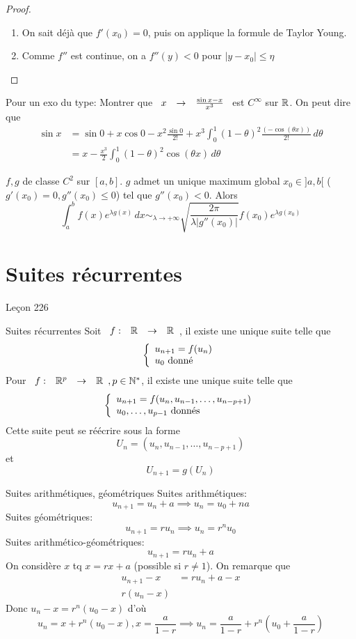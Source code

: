 \documentclass[]{report}
\begin{document}
\begin{proof}
    \begin{enumerate}
        \item On sait déjà que $f'(x_0)=0$, puis on applique la formule de Taylor Young.
        \item Comme $f''$ est continue, on a $f''(y)<0$ pour $|y-x_0|\le \eta$
    \end{enumerate}
\end{proof}

\begin{re}{}{}
    Pour un exo du type: Montrer que $\begin{array}{ccccc} x & \to & \frac{\sin x-x}{ x^3} \end{array}$ est $C^\infty$ sur $\mathbb{R}$. On peut dire que
    \begin{align*}
        \sin x & = \sin 0 +x\cos 0 - x^2\frac{\sin 0}{2!}+x^3 \int_0^1 (1-\theta)^2 \frac{\left(-\cos (\theta x)\right)}{2!}\, d\theta \\
               & = x-\frac{x^3}{2}\int_{0}^{1}(1-\theta)^2 \cos (\theta x)\, d\theta
    \end{align*}
\end{re}

\begin{prop}{}{}
    $f,g$ de classe $C^2$ sur $[a,b]$. $g$ admet un unique maximum global $x_0\in ]a,b[$ ($g'(x_0)=0,g''(x_0)\le 0$) tel que $g''(x_0)<0$. Alors \\
    \[\int_{a}^{b} f(x) e^{\lambda g(x)}\, dx  \sim_{\lambda \to +\infty} \sqrt{\frac{2\pi}{\lambda \left|g''(x_0)\right|}} f(x_0) e^{\lambda g(x_0)}\]
\end{prop}

\chapter{Suites récurrentes}

Leçon 226

\begin{df}{Suites récurrentes}{}
    Soit $\begin{array}{ccccc} f : & \mathbb{R} & \to & \mathbb{R} \end{array}$, il existe une unique suite telle que
    \[\left\{\begin{array}{ll} u_{n+1}=f(u_n)\\ u_0 \text{ donné} \end{array} \right.\]
    Pour $\begin{array}{ccccc} f : & \mathbb{R}^p & \to & \mathbb{R} \end{array},p\in \mathbb{N}^*$, il existe une unique suite telle que
    \[\left\{\begin{array}{ll} u_{n+1}=f(u_n,u_{n-1},\ldots,u_{n-p+1})\\ u_0,\ldots,u_{p-1}\text{ donnés} \end{array} \right.\]
    Cette suite peut se  réécrire sous la forme
    \[U_n=\left(u_{n},u_{n-1},\ldots,u_{n-p+1}\right)\]
    et
    \[U_{n+1}=g(U_n)\]
\end{df}

\begin{df}{Suites arithmétiques, géométriques}{}
    Suites arithmétiques:
    \[u_{n+1}=u_n+a\implies u_n=u_0+na\]
    Suites géométriques:
    \[u_{n+1}=r u_n\implies u_n=r^nu_0\]
    Suites arithmético-géométriques: 
    \[u_{n+1}=r u_n+a\]
    On considère $x$ tq $x=rx+a$ (possible si $r\neq 1$). On remarque que
    \begin{align*}
        u_{n+1}-x&=ru_n +a -x\\
        r(u_n-x)
    \end{align*}
    Donc $u_n-x=r^n(u_0-x)$ d'où
    \[u_n=x+ r^n(u_0-x),x=\frac{a}{1-r}\implies u_n=\frac{a}{1-r}+r^n\left(u_0 + \frac{a}{1-r}\right)\]
\end{df}
\end{document}
